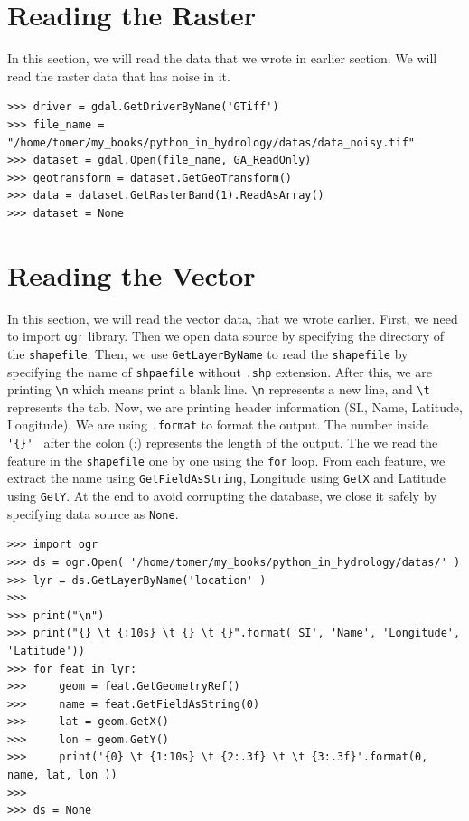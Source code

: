\documentclass[10pt]{book}
\begin{document}
{\section{Reading the Raster}
In this section, we will read the data that we wrote in earlier section. We will read the raster data that has noise in it. 
\beforeverb \begin{verbatim}
>>> driver = gdal.GetDriverByName('GTiff')
>>> file_name = "/home/tomer/my_books/python_in_hydrology/datas/data_noisy.tif"
>>> dataset = gdal.Open(file_name, GA_ReadOnly)
>>> geotransform = dataset.GetGeoTransform()
>>> data = dataset.GetRasterBand(1).ReadAsArray()
>>> dataset = None
\end{verbatim} \afterverb

\section{Reading the Vector}
In this section, we will read the vector data, that we wrote earlier. First, we need to import \verb"ogr" library. Then we open data source by specifying the directory of the \verb"shapefile". Then, we use \verb"GetLayerByName" to read the \verb"shapefile" by specifying the name of \verb"shpaefile" without \verb".shp" extension. After this, we are printing \verb"\n" which means print a blank line. \verb"\n" represents a new line, and \verb"\t" represents the tab. Now, we are printing header information (SI., Name, Latitude, Longitude). We are using \verb".format" to format the output. The number inside \verb" '{}' " after the colon (:) represents the length of the output. The we read the feature in the \verb"shapefile" one by one using the \verb"for" loop. From each feature, we extract the name using \verb"GetFieldAsString", Longitude using \verb"GetX" and  Latitude using \verb"GetY". At the end to avoid corrupting the database, we close it safely by specifying data source as \verb"None".

\beforeverb
\begin{verbatim}
>>> import ogr
>>> ds = ogr.Open( '/home/tomer/my_books/python_in_hydrology/datas/' )
>>> lyr = ds.GetLayerByName('location' )
>>> 
>>> print("\n")
>>> print("{} \t {:10s} \t {} \t {}".format('SI', 'Name', 'Longitude', 'Latitude'))
>>> for feat in lyr:
>>>     geom = feat.GetGeometryRef()
>>>     name = feat.GetFieldAsString(0)
>>>     lat = geom.GetX()
>>>     lon = geom.GetY()
>>>     print('{0} \t {1:10s} \t {2:.3f} \t \t {3:.3f}'.format(0, name, lat, lon ))
>>>    
>>> ds = None


\end{verbatim}}
\end{document}
